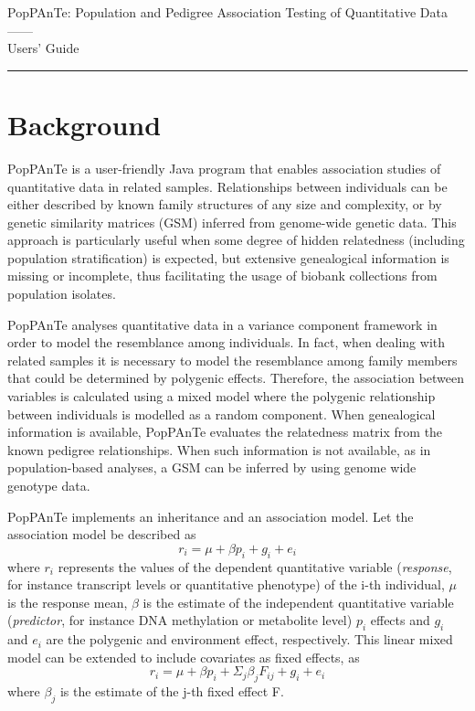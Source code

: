 \documentclass[a4paper,9pt]{article}
\newcommand{\bigtitle}[1]{
	{\begin{center} 
		\huge #1\\[1ex]
		\hrule
	\end{center}}
}
\begin{document}
\begin{center}
\bigtitle{PopPAnTe: Population and Pedigree Association Testing of Quantitative Data \\ ------ \\  Users' Guide}
\end{center}

\vspace{0.5cm}


\section{Background}

PopPAnTe is a user-friendly Java program that enables association studies of quantitative data in related samples. Relationships between individuals can be either described by known family structures of any size and complexity, or by genetic similarity matrices (GSM) inferred from genome-wide genetic data. This approach is particularly useful when some degree of hidden relatedness (including population stratification) is expected, but extensive genealogical information is missing or incomplete, thus facilitating the usage of biobank collections from population isolates. 


\vspace{0.3cm}
\noindent
PopPAnTe analyses quantitative data in a variance component framework in order to model the resemblance among individuals. In fact, when dealing with related samples it is necessary to model the resemblance among family members that could be determined by polygenic effects. Therefore, the association between variables is calculated using a mixed model where the polygenic relationship between individuals is modelled as a random component. 
When genealogical information is available, PopPAnTe evaluates the relatedness matrix from the known pedigree relationships. When such information is not available, as in population-based analyses, a GSM  can be inferred by using genome wide genotype data.

\noindent
PopPAnTe implements an inheritance and an association model. 
%
Let the association model be described as
\[
r_i = \mu + \beta p_i + g_i +e_i			
\]						
where $r_i$ represents the values of the dependent quantitative variable (\emph{response}, for instance transcript levels or quantitative phenotype) of the i-th individual, $\mu$ is the response mean, $\beta$ is the estimate of the independent quantitative variable (\emph{predictor}, for instance DNA methylation or metabolite level) $p_i$ effects and $g_i$ and $e_i$  are  the polygenic and environment effect, respectively. 
%
This linear mixed model can be extended to include covariates as fixed effects, as
\[
r_i = \mu + \beta p_i + \Sigma_j \beta_j F_{ij} + g_i + e_i                                               
\]
where $\beta_j$ is the estimate of the j-th fixed effect F.
\end{document}
